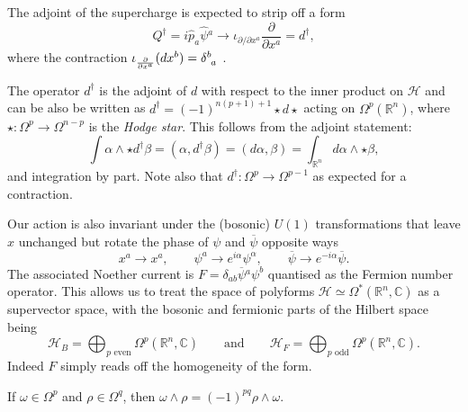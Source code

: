 
The adjoint of the supercharge is expected to strip off a form
\begin{equation}
  Q^{\dagger} = i \hat{p}_a \hat{\psi}{}^a \to \iota_{\partial / \partial x^a} \frac{\partial }{\partial x^{a}} = d^{\dagger},
\end{equation}
where the contraction $\iota_{\frac{\partial }{\partial x^{a}}} (d x^{b}) = \delta\indices{^{b}_{a}}$ .

The operator $d^{\dagger}$ is the adjoint of $d$ with respect to the inner product on $\mathscr{H}$ and can be also be written as $d^{\dagger} = (-1)^{n (p+1) + 1} \star d \star {}$ acting on $\Omega^p (\mathbb{R}^n)$, where $\star \colon \Omega^p \to \Omega^{n-p}$ is the \emph{Hodge star}.
This follows from the adjoint statement:
\begin{equation}
  \int \alpha \wedge \star d^{\dagger} \beta = (\alpha, d^{\dagger} \beta) = (d\alpha, \beta) = \int_{\mathbb{R}^n} d\alpha \wedge \star \beta,
\end{equation}
and integration by part.
Note also that $d^{\dagger} \colon \Omega^p \to \Omega^{p-1}$ as expected for a contraction.

Our action is also invariant under the (bosonic) $U(1)$ transformations that leave $x$ unchanged but rotate the phase of $\psi$ and $\overline{\psi}{}$ opposite ways
\begin{equation}
  x^{a} \to x^{a} , \qquad \psi^{a} \to e^{i \alpha} \psi^{\alpha}, \qquad \overline{\psi}{} \to e^{-i \alpha} \overline{\psi}{}.
\end{equation}
The associated Noether current is $F = \delta_{ab} \overline{\psi}{}^{a} \psi^{b}$ quantised as the Fermion number operator.
This allows us to treat the space of polyforms $\mathscr{H} \simeq \Omega^*(\mathbb{R}^n, \mathbb{C})$ as a supervector space, with the bosonic and fermionic parts of the Hilbert space being
\begin{equation}
  \mathscr{H}_{B} = \bigoplus_{p \text{ even}} \Omega^{p}(\mathbb{R}^n, \mathbb{C}) \qquad \text{and} \qquad \mathscr{H}_F = \bigoplus_{p \text{ odd}} \Omega^p (\mathbb{R}^n, \mathbb{C}).
\end{equation}
Indeed $F$  simply reads off the homogeneity of the form.
\begin{remark}
  If $\omega \in \Omega^p$ and $\rho \in \Omega^q$, then $\omega \wedge \rho = (-1)^{pq} \rho \wedge \omega$.
\end{remark}

